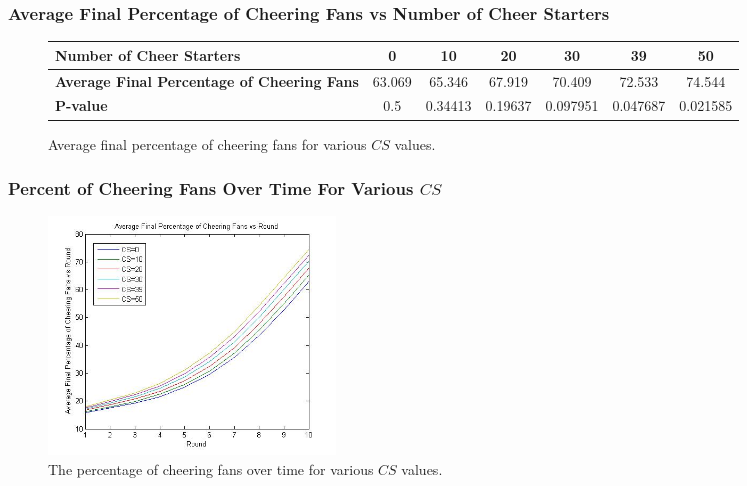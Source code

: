 \documentclass[compress,handout,10pt]{beamer}
\begin{document}
\begin{frame}
\frametitle{Average Final Percentage of Cheering Fans vs Number of Cheer Starters}
\begin{figure}[h]
\begin{center}
\begin{tiny}\begin{tabular}{|l|c|c|c|c|c|c|}
\hline
\textbf{Number of Cheer Starters}&0&10&20&30&39&50\\\hline
\textbf{Average Final Percentage of Cheering Fans}&63.069&65.346&67.919&70.409&72.533&74.544\\\hline
\textbf{P-value}&0.5&0.34413&0.19637&0.097951&0.047687&0.021585\\\hline
\end{tabular}
\end{tiny}
\caption{{\tiny Average final percentage of cheering fans for various $CS$ values.}}
\end{center}
\end{figure}
\end{frame}

\begin{frame}
	\frametitle{Percent of Cheering Fans Over Time For Various $CS$}
	\begin{figure} [h]
		\begin{center}
    			\includegraphics [width=3in] {46(2).jpg}
    			\caption {{\tiny The percentage of cheering fans over time for various $CS$ values.}}
    		\end{center}
    	\end {figure}	
\end{frame}
\end{document}
